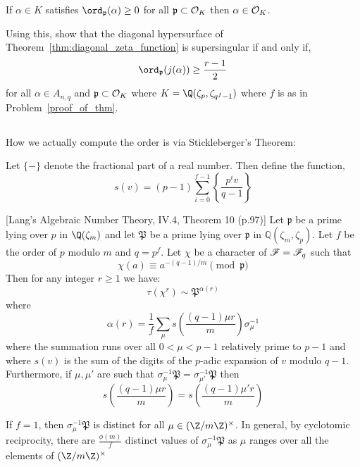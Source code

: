 \documentclass[12pt]{article}
\begin{document}
\begin{lemma}
If $\alpha \in K$ satisfies $\ord_{\p}(\alpha) \ge 0$ for all $\mathfrak{p} \subset \mathcal{O}_{K}$ then $\alpha \in \mathcal{O}_{K}$.
\end{lemma}

Using this, show that the diagonal hypersurface of Theorem~\ref{thm:diagonal_zeta_function} is supersingular if and only if,
\[ \ord_{\p}(j(\alpha)) \ge \frac{r-1}{2} \]
for all $\alpha \in A_{n, q}$ and $\mathfrak{p} \subset \mathcal{O}_{K}$ where $K = \Q(\zeta_p, \zeta_{q^f-1})$ where $f$ is as in Problem~\ref{proof_of_thm}.

\subsection{}

How we actually compute the order is via Stickleberger's Theorem:


\begin{defn}
Let $\{ - \}$ denote the fractional part of a real number. Then define the function,
\[ s\left( v \right) = (p-1) \sum_{i = 0}^{f-1} \left\{ \frac{p^i v}{q - 1} \right\} \]
\end{defn}


\begin{theorem} \label{thm:gauss_fact_lang}[Lang's Algebraic Number Theory, IV.4, Theorem 10 (p.97)]
Let $\mathfrak{p}$ be a prime lying over $p$ in $\Q(\zeta_{m})$ and let $\mathfrak{P}$ be a prime lying over $\mathfrak{p}$ in $\mathbb{Q}(\zeta_{m}, \zeta_p)$. Let $f$ be the order of $p$ modulo $m$ and $q = p^f$. Let $\chi$ be a character of $\mathscr{F}=\mathscr{F}_q$ such that
\[\chi(a) \equiv a^{-(q-1)/m} \pmod{\mathfrak{p}}\]
Then for any integer $r \ge 1$ we have:
\[\tau\left(\chi^r\right) \sim \mathfrak{P}^{\alpha(r)}\]
where 
\[\alpha(r) = \frac{1}{f}\sum_{\mu} s\left(\frac{(q-1)\mu r}{m}\right)\sigma_{\mu}^{-1}\]
where the summation runs over all $0 < \mu < p-1$ relatively prime to $p-1$ and where $s(v)$ is the sum of the digits of the $p$-adic expansion of $v$ modulo $q - 1$. Furthermore, if $\mu, \mu'$ are such that $\sigma_{\mu}^{-1}\mathfrak{P} = \sigma_{\mu'}^{-1}\mathfrak{P}$ then
\[s\left(\frac{(q-1)\mu r}{m}\right) = s\left(\frac{(q-1)\mu' r}{m}\right)\]
\end{theorem}


\begin{remark} If $f = 1$, then $\sigma_{\mu}^{-1} \mathfrak{P}$ is distinct for all $\mu\in(\Z/m\Z)^{\times}$. In general, by cyclotomic reciprocity, there are $\frac{\phi(m)}{f}$ distinct values of $\sigma_{\mu}^{-1} \mathfrak{P}$ as $\mu$ ranges over all the elements of $(\Z/m\Z)^{\times}$
\end{remark}
\end{document}
